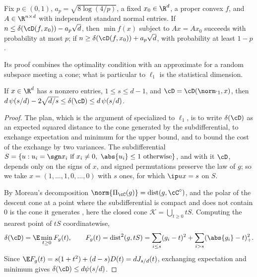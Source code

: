 \begin{refsection}
\begin{theorem*}
Fix $p\in(0,1)$, $a_p=\sqrt{8\log(4/p)}$, a fixed $x_0\in\R^d$, a proper convex $f$, and $A\in\R^{n\times d}$ with independent standard normal entries. If $n\le\delta(\cD(f,x_0))-a_p\sqrt d$, then $\min f(x)$ subject to $Ax=Ax_0$ succeeds with probability at most $p$; if $n\ge\delta(\cD(f,x_0))+a_p\sqrt d$, with probability at least $1-p$.
\end{theorem*}

Its proof combines the optimality condition with an approximate  for a random subspace meeting a cone; what is particular to $\ell_1$ is the statistical dimension.

\begin{theorem}\label{thm:lasso:statdim}
If $x\in\R^d$ has $s$ nonzero entries, $1\le s\le d-1$, and $\cD=\cD(\norm\cdot_1,x)$, then $d\,\psi(s/d)-2\sqrt{d/s}\le\delta(\cD)\le d\,\psi(s/d)$.
\end{theorem}

\begin{proof}
The plan, which is the argument of \textcite[Proposition~4.1 and Appendix~C.2]{AmelunxenEtAl2014} specialized to $\ell_1$, is to write $\delta(\cD)$ as an expected squared distance to the cone generated by the subdifferential, to exchange expectation and minimum for the upper bound, and to bound the cost of the exchange by two variances. The subdifferential $S=\{u:u_i=\sgn x_i\text{ if }x_i\ne0,\ \abs{u_i}\le1\text{ otherwise}\}$, and with it $\cD$, depends only on the signs of $x$, and signed permutations preserve the law of $g$; so we take $x=(1,\dots,1,0,\dots,0)$ with $s$ ones, for which $\ip ux=s$ on $S$.

By Moreau's decomposition $\norm{\Pi_\cC(g)}=\operatorname{dist}(g,\cC^\circ)$, and the polar of the descent cone at a point where the subdifferential is compact and does not contain $0$ is the cone it generates \parencite[Corollary~23.7.1]{Rockafellar1970}, here the closed cone $\mathcal K=\bigcup_{t\ge0}tS$. Computing the nearest point of $tS$ coordinatewise,
\[
\delta(\cD)=\E\min_{t\ge0}F_g(t),\qquad F_g(t)=\operatorname{dist}^2(g,tS)=\sum_{i\le s}(g_i-t)^2+\sum_{i>s}(\abs{g_i}-t)_+^2.
\]
Since $\E F_g(t)=s(1+t^2)+(d-s)D(t)=dJ_{s/d}(t)$, exchanging expectation and minimum gives $\delta(\cD)\le d\psi(s/d)$.


\end{proof}
\end{refsection}
